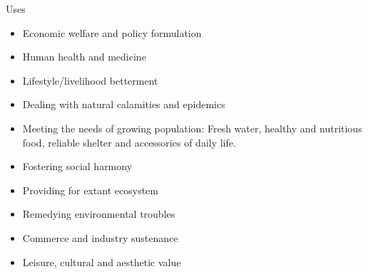 \documentclass[ignorenonframetext,aspectratio=169]{beamer}
\providecommand{\tightlist}{%
  \setlength{\itemsep}{0pt}\setlength{\parskip}{0pt}}
\begin{document}
\begin{frame}{Uses}
\protect\hypertarget{uses}{}

\begin{itemize}
\tightlist
\item
  Economic welfare and policy formulation
\item
  Human health and medicine
\item
  Lifestyle/livelihood betterment
\item
  Dealing with natural calamities and epidemics
\item
  Meeting the needs of growing population: Fresh water, healthy and
  nutritious food, reliable shelter and accessories of daily life.
\item
  Fostering social harmony
\item
  Providing for extant ecosystem
\item
  Remedying environmental troubles
\item
  Commerce and industry sustenance
\item
  Leisure, cultural and aesthetic value
\end{itemize}

\end{frame}
\end{document}
